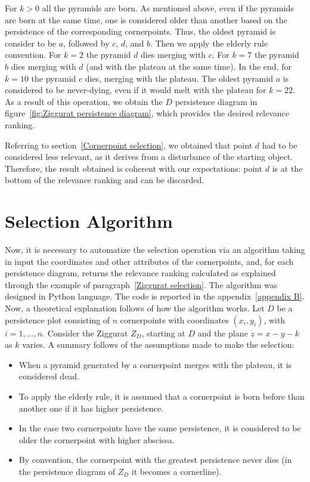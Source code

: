 \documentclass[english, LaM, oneside, noexaminfo]{sapthesis}
\begin{document}
\noindent For $k>0$ all the
pyramids are born. As mentioned above, even if the pyramids are born at the same time,
one is considered older than another based on the persistence of the corresponding cornerpoints. Thus, the oldest pyramid is consider to be
$a$, followed by $c$, $d$, and $b$. Then we apply the elderly rule convention.
For $k = 2$ the pyramid $d$ dies merging with $c$. For $k = 7$ the pyramid $b$ dies merging with $d$ (and with the plateau at the same time). In the end, for $ k = 10$ the pyramid $c$ dies, merging with the plateau.
The oldest pyramid $a$ is considered to be never-dying, even if it would melt with the plateau for $ k = 22$. As a result of this operation, we obtain the $D$ persistence diagram in figure~\ref{fig:Ziggurat persistence diagram}, which provides the desired relevance ranking.

\noindent Referring to section~\ref{Cornerpoint selection}, we obtained that point $d$ had to be
considered less relevant, as it derives from a disturbance of the starting object. Therefore, the result obtained is coherent with our expectations: point $d$ is at the bottom of the relevance ranking and can be discarded.

\section{Selection Algorithm}

Now, it is necessary to automatize the selection operation via
an algorithm taking in input the coordinates and other attributes of the cornerpoints, and, for
each persistence diagram, returns the relevance ranking calculated as explained through the example of paragraph~\ref{Ziggurat selection}. The algorithm was designed in Python language. The code is
reported in the appendix~\ref{appendix B}.
Now, a theoretical explanation follows of how the algorithm works.
Let $D$ be a persistence plot consisting of $n$ cornerpoints with coordinates $(x_i, y_i)$, with $i = 1, \dots, n$. Consider the Ziggurat $Z_D$, starting at $D$ and
the plane $z = x - y - k$ as $k$ varies. A summary follows of the assumptions made to make the selection:
\begin{itemize}
    \item When a pyramid generated by a cornerpoint merges with the plateau, it is considered dead.
    \item To apply the elderly rule, it is assumed that a  cornerpoint is born before than another one if it has higher persistence.
    \item In the case two cornerpoints have the same persistence, it is considered to be older the cornerpoint with higher abscissa.
    \item By convention, the cornerpoint with the greatest persistence never dies (in the persistence diagram of $Z_D$ it becomes a cornerline).
\end{itemize}
\end{document}
